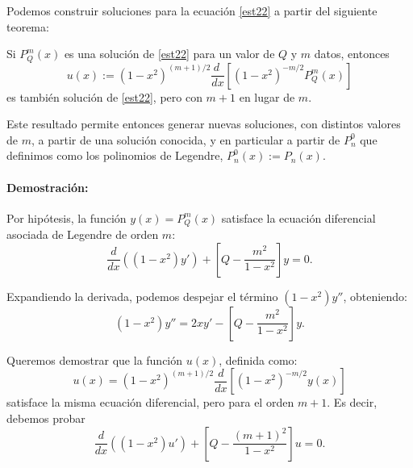Podemos construir soluciones para la ecuación \eqref{est22} a partir del siguiente teorema:
\begin{tcolorbox}
Si $P_Q^m(x)$ es una solución de \eqref{est22} para un valor de $Q$ y $m$ datos, entonces 
\begin{equation}\label{defux}
u(x):=(1-x^2)^{(m+1)/2}\frac{d\ }{dx}\left[(1-x^2)^{-m/2}P_Q^m(x)\right]
\end{equation}
es también solución de \eqref{est22}, pero con $m+1$ en lugar de $m$.
\end{tcolorbox}
Este resultado permite entonces generar nuevas soluciones, con distintos valores de $m$, a partir de una solución conocida, y en particular a partir de $P_n^0$ que definimos como los polinomios de Legendre, $P_n^0(x):=P_n(x)$. 

\begin{scriptsize}
\paragraph{Demostración:}

Por hipótesis, la función $y(x) = P_Q^m(x)$ satisface la ecuación diferencial asociada de Legendre de orden $m$:
\begin{equation}
    \frac{d}{dx}\left((1-x^2)y'\right) + \left[Q-\frac{m^2}{1-x^2}\right]y = 0 .\label{eq:legendre_m}
\end{equation}

Expandiendo la derivada, podemos despejar el término $(1-x^2)y''$, obteniendo:
\begin{equation}
    (1-x^2)y'' = 2xy' - \left[Q-\frac{m^2}{1-x^2}\right]y .\label{eq:y_segunda}
\end{equation}

Queremos demostrar que la función $u(x)$, definida como:
\begin{equation}
    u(x) = (1-x^2)^{(m+1)/2}\frac{d}{dx}\left[(1-x^2)^{-m/2}y(x)\right] \label{eq:def_u}
\end{equation}
satisface la misma ecuación diferencial, pero para el orden $m+1$. Es decir, debemos probar 
\begin{equation}
    \frac{d}{dx}\left((1-x^2)u'\right) + \left[Q-\frac{(m+1)^2}{1-x^2}\right]u = 0. \label{eq:objetivo}
\end{equation}


\end{scriptsize}
